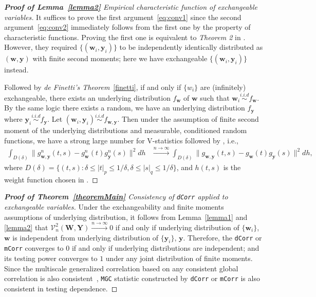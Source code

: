 \documentclass[12pt]{article}
\theoremstyle{definition}
\begin{document}
\begin{proof}[\textbf{Proof of Lemma~\ref{lemma2}} Empirical characteristic function of exchangeable variables] 
\bigskip	
It suffices to prove the first argument~\ref{eq:conv1} since the second argument~\ref{eq:conv2} immediately follows from the first one by the property of characteristic functions.
Proving the first one is equivalent to \textit{Theorem 2} in \cite{szekely2007measuring}. However, they required $\{(\mathbf{w}_{i},\mathbf{y}_{i})\}$ to be independently identically distributed as $(\mathbf{w},\mathbf{y})$ with finite second moments; here we have exchangeable $\{ ( \mathbf{w}_{i}, \mathbf{y}_{i}  ) \}$ instead. 

Followed by \textit{de Finetti's Theorem}~\ref{finetti}, if and only if $\{ w_{i} \}$ are (infinitely) exchangeable, there exists an underlying distribution $f_{\mathbf{w}}$ of $\mathbf{w}$ such that $\mathbf{w}_{i}  \overset{i.i.d}{\sim} f_{\mathbf{w}} $. By the same logic there exists a random, we have an underlying distribution $f_{\mathbf{y}}$ where $\mathbf{y}_{i} \overset{i.i.d}{\sim} f_{\mathbf{y}}$. Let $(\mathbf{w}_{i}, \mathbf{y}_{i}) \overset{i.i.d}{\sim}   f_{\mathbf{w}, \mathbf{y}}$. Then under the assumption of finite second moment of the underlying distributions and measurable, conditioned random functions, we have a strong large number for V-statistics followed by \cite{szekely2007measuring}, i.e., 
\begin{eqnarray}
		\displaystyle\int_{D(\delta)}{\|g_{\mathbf{w},\mathbf{y}}^{n}(t,s)-g_{\mathbf{w}}^{n}(t)g_{\mathbf{y}}^{n}(s)\|^{2}}dh &\stackrel{n \rightarrow \infty}{\longrightarrow} 
		 \displaystyle\int_{D(\delta)}{\|g_{\mathbf{w},\mathbf{y}}(t,s)-g_{\mathbf{w}}(t)g_{\mathbf{y}}(s)\|^{2}}dh,
\label{eq:SLLN}
\end{eqnarray}
where $D(\delta)=\{(t,s):\delta \leq |t|_{p} \leq 1/\delta,\delta \leq |s|_{q} \leq 1/\delta\}$, and $h(t,s)$ is the weight function chosen in \cite{szekely2007measuring}. 
\end{proof}

\begin{proof}[\textbf{Proof of Theorem~\ref{theoremMain}} Consistency of \texttt{dCorr} applied to exchangeable variables]
\bigskip
Under the exchangeability and finite moments assumptions of underlying distribution, it follows from Lemma~\ref{lemma1} and \ref{lemma2} that $\mathcal{V}^{2}_{n}(\mathbf{W},\mathbf{Y}) \xrightarrow{n \rightarrow \infty}  0$ if and only if underlying distribution of $\{\mathbf{w}_{i} \}$, $\mathbf{w}$ is independent from underlying distribution of $\{ \mathbf{y}_{i}  \}$, $\mathbf{y}$. Therefore, the \texttt{dCorr} or \texttt{mCorr} converges to $0$ if and only if  underlying distributions are independent; and its testing power converges to $1$ under any joint distribution of finite moments. Since the multiscale generalized correlation based on any consistent global correlation is also consistent~\citep{shen2016discovering}, \texttt{MGC} statistic constructed by \texttt{dCorr} or \texttt{mCorr} is also consistent in testing dependence.
\end{proof}
\end{document}
